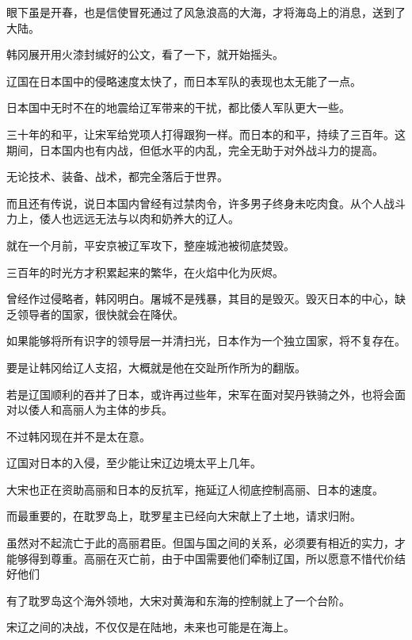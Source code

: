 眼下虽是开春，也是信使冒死通过了风急浪高的大海，才将海岛上的消息，送到了大陆。

韩冈展开用火漆封缄好的公文，看了一下，就开始摇头。

辽国在日本国中的侵略速度太快了，而日本军队的表现也太无能了一点。

日本国中无时不在的地震给辽军带来的干扰，都比倭人军队更大一些。

三十年的和平，让宋军给党项人打得跟狗一样。而日本的和平，持续了三百年。这期间，日本国内也有内战，但低水平的内乱，完全无助于对外战斗力的提高。

无论技术、装备、战术，都完全落后于世界。

而且还有传说，说日本国内曾经有过禁肉令，许多男子终身未吃肉食。从个人战斗力上，倭人也远远无法与以肉和奶养大的辽人。

就在一个月前，平安京被辽军攻下，整座城池被彻底焚毁。

三百年的时光方才积累起来的繁华，在火焰中化为灰烬。

曾经作过侵略者，韩冈明白。屠城不是残暴，其目的是毁灭。毁灭日本的中心，缺乏领导者的国家，很快就会在降伏。

如果能够将所有识字的领导层一并清扫光，日本作为一个独立国家，将不复存在。

要是让韩冈给辽人支招，大概就是他在交趾所作所为的翻版。

若是辽国顺利的吞并了日本，或许再过些年，宋军在面对契丹铁骑之外，也将会面对以倭人和高丽人为主体的步兵。

不过韩冈现在并不是太在意。

辽国对日本的入侵，至少能让宋辽边境太平上几年。

大宋也正在资助高丽和日本的反抗军，拖延辽人彻底控制高丽、日本的速度。

而最重要的，在耽罗岛上，耽罗星主已经向大宋献上了土地，请求归附。

虽然对不起流亡于此的高丽君臣。但国与国之间的关系，必须要有相近的实力，才能够得到尊重。高丽在灭亡前，由于中国需要他们牵制辽国，所以愿意不惜代价结好他们

有了耽罗岛这个海外领地，大宋对黄海和东海的控制就上了一个台阶。

宋辽之间的决战，不仅仅是在陆地，未来也可能是在海上。

